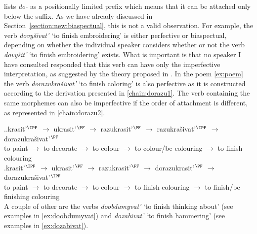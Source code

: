 \citet{Tatevosov:09} lists \textit{do-} as a positionally limited prefix which means that it can be attached only below the  suffix. As we have already discussed in Section~\ref{section:new:biaspectual}, this is not a valid observation. For example, the verb \textit{dovy\v{s}ivat'} `to finish embroidering' is either perfective or biaspectual, depending on whether the individual speaker considers whether or not the verb \textit{dovy\v{s}it'} `to finish embroidering' exists. What is important is that no speaker I have consulted responded that this verb can have only the imperfective interpretation, as suggested by the theory proposed in \citealt{Tatevosov:09}. In the poem \ref{ex:poem} the verb \textit{dorazukra\v{s}ivat'} `to finish coloring' is also perfective as it is constructed according to the derivation presented in \ref{chain:dorazu1}. The verb containing the same morphemes can also be imperfective if the order of attachment is different, as represented in \ref{chain:dorazu2}.

\ex.\ag.\label{chain:dorazu1}krasit'$^{\IPF}$ $\rightarrow$ ukrasit'$^{\PF}$ $\rightarrow$ razukrasit'$^{\PF}$ $\rightarrow$ razukra\v{s}ivat'$^{\IPF}$ $\rightarrow$ dorazukra\v{s}ivat'$^{\PF}$\\
{to paint} $\rightarrow$ {to decorate} $\rightarrow$ {to colour} $\rightarrow$ {to colour/be colouring} $\rightarrow$ {to finish colouring}\\
\bg.\label{chain:dorazu2}krasit'$^{\IPF}$ $\rightarrow$ ukrasit'$^{\PF}$ $\rightarrow$ razukrasit'$^{\PF}$ $\rightarrow$ dorazukrasit'$^{\PF}$ $\rightarrow$ dorazukra\v{s}ivat'$^{\IPF}$\\
{to paint} $\rightarrow$ {to decorate} $\rightarrow$ {to colour} $\rightarrow$ {to finish colouring} $\rightarrow$ {to finish/be finishing colouring}\\

A couple of other  are the verbs \textit{doobdumyvat'} `to finish thinking about' (see examples in \ref{ex:doobdumyvat}) and \textit{dozabivat'} `to finish hammering' (see examples in \ref{ex:dozabivat}).

